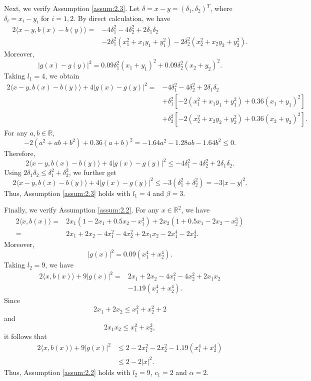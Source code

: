 \documentclass{article}
\begin{document}
Next, we verify Assumption \ref{assum:2.3}. Let
$\delta=x-y=(\delta_1,\delta_2)^T$, where $\delta_i=x_i-y_i$ for $i=1,2$.
By direct calculation, we have
\begin{align*}
2\langle x-y,b(x)-b(y)\rangle
=&-4\delta_1^2-4\delta_2^2+2\delta_1\delta_2  \\
&-2\delta_1^2(x_1^2+x_1y_1+y_1^2)
-2\delta_2^2(x_2^2+x_2y_2+y_2^2).
\end{align*}
Moreover,
\begin{equation*}
|g(x)-g(y)|^2
=
0.09\delta_1^2(x_1+y_1)^2
+
0.09\delta_2^2(x_2+y_2)^2.
\end{equation*}
Taking $l_1=4$, we obtain
\begin{align*}
2\langle x-y,b(x)-b(y)\rangle
+4|g(x)-g(y)|^2 =&-4\delta_1^2-4\delta_2^2+2\delta_1\delta_2  \\
&+\delta_1^2\left[-2(x_1^2+x_1y_1+y_1^2)
+0.36(x_1+y_1)^2\right]  \\
&+\delta_2^2\left[-2(x_2^2+x_2y_2+y_2^2)
+0.36(x_2+y_2)^2\right].
\end{align*}
For any $a,b\in\mathbb{R}$,
\begin{equation*}
-2(a^2+ab+b^2)+0.36(a+b)^2
=
-1.64a^2-1.28ab-1.64b^2
\leq 0.
\end{equation*}
Therefore,
\begin{equation*}
2\langle x-y,b(x)-b(y)\rangle
+4|g(x)-g(y)|^2
\leq
-4\delta_1^2-4\delta_2^2+2\delta_1\delta_2.
\end{equation*}
Using $2\delta_1\delta_2\leq \delta_1^2+\delta_2^2$, we further get
\begin{equation*}
2\langle x-y,b(x)-b(y)\rangle
+4|g(x)-g(y)|^2
\leq
-3(\delta_1^2+\delta_2^2)
=
-3|x-y|^2.
\end{equation*}
Thus, Assumption \ref{assum:2.3} holds with $l_1=4$ and $\beta=3$.

Finally, we verify Assumption \ref{assum:2.2}. For any $x\in\mathbb{R}^2$, we have
\begin{align*}
2\langle x,b(x)\rangle
=&2x_1(1-2x_1+0.5x_2-x_1^3)
+2x_2(1+0.5x_1-2x_2-x_2^3)\\
=&2x_1+2x_2-4x_1^2-4x_2^2+2x_1x_2
-2x_1^4-2x_2^4.
\end{align*}
Moreover,
\begin{equation*}
|g(x)|^2=0.09(x_1^4+x_2^4).
\end{equation*}
Taking $l_2=9$, we have
\begin{align*}
2\langle x,b(x)\rangle+9|g(x)|^2
=&2x_1+2x_2-4x_1^2-4x_2^2+2x_1x_2\\
&-1.19(x_1^4+x_2^4).
\end{align*}
Since
\begin{equation*}
2x_1+2x_2\leq x_1^2+x_2^2+2
\end{equation*}
and
\begin{equation*}
2x_1x_2\leq x_1^2+x_2^2,
\end{equation*}
it follows that
\begin{align*}
2\langle x,b(x)\rangle+9|g(x)|^2
&\leq 2-2x_1^2-2x_2^2-1.19(x_1^4+x_2^4)\\
&\leq 2-2|x|^2.
\end{align*}
Thus, Assumption \ref{assum:2.2} holds with $l_2=9$, $c_1=2$ and $\alpha=2$.
\end{document}
